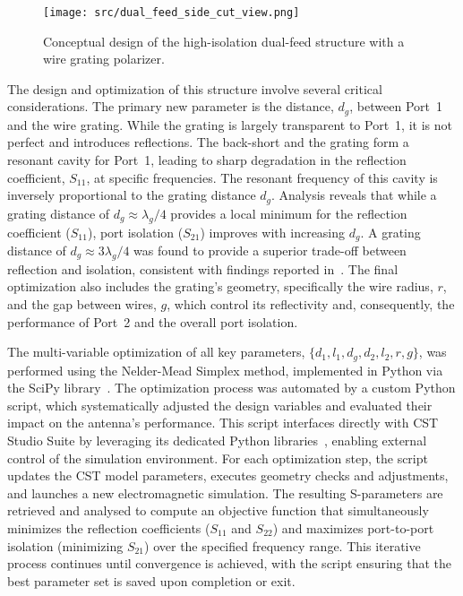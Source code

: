 \documentclass[journal]{IEEEtran}
\begin{document}
\begin{figure}[!b]
    \centering
    \texttt{[image: src/dual\_feed\_side\_cut\_view.png]}
    \caption{\label{fig:dual-feed-conceptual}Conceptual design of the high-isolation dual-feed structure with a wire grating polarizer.}
\end{figure}

The design and optimization of this structure involve several critical considerations. The primary new parameter is the distance, $d_g$, between Port~1 and the wire grating. While the grating is largely transparent to Port~1, it is not perfect and introduces reflections. The back-short and the grating form a resonant cavity for Port~1, leading to sharp degradation in the reflection coefficient, $S_{11}$, at specific frequencies. The resonant frequency of this cavity is inversely proportional to the grating distance $d_g$. Analysis reveals that while a grating distance of $d_g \approx \lambda_g/4$ provides a local minimum for the reflection coefficient ($S_{11}$), port isolation ($S_{21}$) improves with increasing $d_g$. A grating distance of $d_g \approx 3\lambda_g/4$ was found to provide a superior trade-off between reflection and isolation, consistent with findings reported in~\cite{karki-et-al:dual-polarized-probe-for-planar-near-field-measurement}. The final optimization also includes the grating's geometry, specifically the wire radius, $r$, and the gap between wires, $g$, which control its reflectivity and, consequently, the performance of Port~2 and the overall port isolation.

The multi-variable optimization of all key parameters, $\{d_1, l_1, d_g, d_2, l_2, r, g\}$, was performed using the Nelder-Mead Simplex method, implemented in Python via the SciPy library~\cite{virtanen-et-al:scipy}. The optimization process was automated by a custom Python script, which systematically adjusted the design variables and evaluated their impact on the antenna's performance. This script interfaces directly with CST Studio Suite by leveraging its dedicated Python libraries~\cite{cst:python-libraries-documentation}, enabling external control of the simulation environment. For each optimization step, the script updates the CST model parameters, executes geometry checks and adjustments, and launches a new electromagnetic simulation. The resulting S-parameters are retrieved and analysed to compute an objective function that simultaneously minimizes the reflection coefficients ($S_{11}$ and $S_{22}$) and maximizes port-to-port isolation (minimizing $S_{21}$) over the specified frequency range. This iterative process continues until convergence is achieved, with the script ensuring that the best parameter set is saved upon completion or exit.
\end{document}
